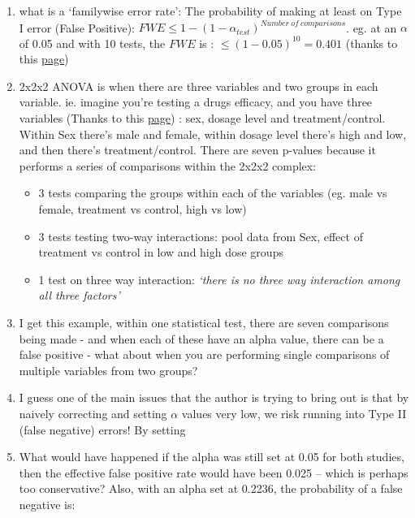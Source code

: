 \documentclass[
]{book}
\providecommand{\tightlist}{%
  \setlength{\itemsep}{0pt}\setlength{\parskip}{0pt}}
\begin{document}
\begin{enumerate}
\def\labelenumi{\arabic{enumi}.}
\tightlist
\item
  what is a `familywise error rate': The probability of making at least on Type I error (False Positive): \(FWE \leq 1-(1-\alpha_{test})^{Number\ of\ comparisons}\). eg. at an \(\alpha\) of 0.05 and with 10 tests, the \(FWE\) is : \(\leq (1-0.05)^{10}=0.401\) (thanks to this \href{https://www.statisticshowto.com/familywise-error-rate/}{page})
\item
  2x2x2 ANOVA is when there are three variables and two groups in each variable. ie. imagine you're testing a drugs efficacy, and you have three variables (Thanks to this \href{https://www.graphpad.com/guides/prism/7/statistics/stat_what_is_three-way_anova_used_f.htm}{page}) : sex, dosage level and treatment/control. Within Sex there's male and female, within dosage level there's high and low, and then there's treatment/control. There are seven p-values because it performs a series of comparisons within the 2x2x2 complex:

  \begin{itemize}
  \tightlist
  \item
    3 tests comparing the groups within each of the variables (eg. male vs female, treatment vs control, high vs low)
  \item
    3 tests testing two-way interactions: pool data from Sex, effect of treatment vs control in low and high dose groups
  \item
    1 test on three way interaction: \emph{`there is no three way interaction among all three factors'}
  \end{itemize}
\item
  I get this example, within one statistical test, there are seven comparisons being made - and when each of these have an alpha value, there can be a false positive - what about when you are performing single comparisons of multiple variables from two groups?
\item
  I guess one of the main issues that the author is trying to bring out is that by naively correcting and setting \(\alpha\) values very low, we risk running into Type II (false negative) errors! By setting
\item
  What would have happened if the alpha was still set at 0.05 for both studies, then the effective false positive rate would have been 0.025 -- which is perhaps too conservative? Also, with an alpha set at 0.2236, the probability of a false negative is:
\end{enumerate}
\end{document}
